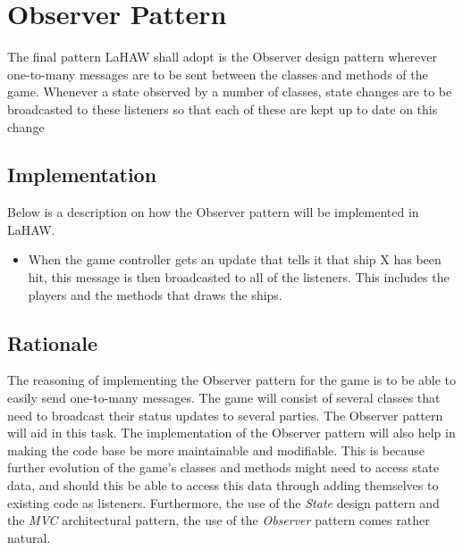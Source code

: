     
    \section{Observer Pattern}
    The final pattern LaHAW shall adopt is the Observer design pattern wherever one-to-many messages are to be sent between the classes and methods of the game. Whenever a state observed by a number of classes, state changes are to be broadcasted to these listeners so that each of these are kept up to date on this change
    
        \subsection{Implementation}    
        Below is a description on how the Observer pattern will be implemented in LaHAW.
    
        \begin{itemize}
            \item When the game controller gets an update that tells it that ship X has been hit, this message is then broadcasted to all of the listeners. This includes the players and the methods that draws the ships.
        \end{itemize}
    
    
        \subsection{Rationale}
        The reasoning of implementing the Observer pattern for the game is to be able to easily send one-to-many messages. The game will consist of several classes that need to broadcast their status updates to several parties. The Observer pattern will aid in this task. The implementation of the Observer pattern will also help in making the code base be more maintainable and modifiable. This is because further evolution of the game's classes and methods might need to access state data, and should this be able to access this data through adding themselves to existing code as listeners. Furthermore, the use of the \emph{State} design pattern and the \emph{MVC} architectural pattern, the use of the \emph{Observer} pattern comes rather natural.
    